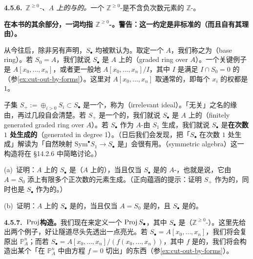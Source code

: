 \textbf{4.5.6.}\ \emph{$\mathbb{Z}^{\ge0}$-\trGradedRing、$A$ 上的\trGradedRing{}与\trFinitelyGenerated{}的\trGradedRing。}\quad 一个 $\mathbb{Z}^{\ge0}$-\trGradedRing{}是不含负次数元素的 $\mathbb{Z}$-\trGradedRing。

\textbf{在本书的其余部分，\trGradedRing{}一词均指 $\mathbb{Z}^{\ge0}$-\trGradedRing。警告：这一约定是非标准的（而且自有其理由）。}

从今往后，除非另有声明，$S_\bullet$ 均被默认为\trGradedRing。取定一个\trRing{} $A$，我们称之为\textbf{\trBaseRing}（base ring）。若 $S_0=A$，我们就说 $S_\bullet$ 是 $A$ 上的\textbf{\trGradedRing}（graded ring over $A$）。一个关键例子是 $A[x_0,\dots,x_n]$，或者更一般地 $A[x_0,\dots,x_n]/I$，其中 $I$ 是满足 $I\cap S_0=0$ 的\trHomogeneous\trIdeal（参\cref{ex:cut-out-by-forms}）。这里对 $A[x_0,\dots,x_n]$ 取通常的\trGrading，即每个 $x_i$ 的权都是 $1$。

子集 $S_+:=\oplus_{i>0}S_i\subset S_\bullet$ 是一个\trIdeal，称为\textbf{\trIrrelevantIdeal}（irrelevant ideal）。「无关」之名的缘由，再过几段自会清楚。若\trIrrelevantIdeal{} $S_+$ 是一个\trFinitelyGenerated{}的\trIdeal，我们就说 $S_\bullet$ 是 $A$ 上的\textbf{\trFinitelyGenerated\trGradedRing}（finitely generated graded ring over $A$）。若 $S_\bullet$ 作为 $A$-\trAlgebra{}由 $S_1$ 生成，我们就说 $S_\bullet$ 是\textbf{在次数 $1$ 处生成的}（generated in degree 1）。（日后我们会发现，把「$S_\bullet$ 在次数 $1$ 处生成」解读为「自然映射 $\mathrm{Sym}^{\bullet}S_1\to S_\bullet$ 是\trSurjectiveMap」会很有用。\emph{\trSymmetricAlgebra}（symmetric algebra）这一构造将在 \S14.2.6 中简略讨论。）

\begin{exercise}\label{ex:fg-graded-rings}
(a)~证明：$A$ 上的\trGradedRing{} $S_\bullet$ 是（$A$ 上的）\trFinitelyGenerated\trGradedRing，当且仅当 $S_\bullet$ 是\trFinitelyGenerated{}的\trGrading{} $A$-\trAlgebra，也就是说，它由 $A=S_0$ 添上有限多个正次数的\trHomogeneous{}元素生成。（正向蕴涵的提示：证明 $S_+$ 作为\trIdeal{}的\trGenerator，同时也是 $S_\bullet$ 作为\trAlgebra{}的\trGenerator。）

(b)~证明：$A$ 上的\trGradedRing{} $S_\bullet$ 是\trNoetherian{}的，当且仅当 $A=S_0$ 是\trNoetherian{}的，且 $S_\bullet$ 是\trFinitelyGenerated{}的\trGradedRing。
\end{exercise}

\textbf{4.5.7.\ $\operatorname{Proj}$构造。}\quad 我们现在来定义一个\trScheme{} $\operatorname{Proj} S_\bullet$，其中 $S_\bullet$ 是（$\mathbb{Z}^{\ge0}$-）\trGradedRing。这里先给出两个例子，好让隧道尽头先透出一点亮光。若 $S_\bullet=A[x_0,\dots,x_n]$，我们将会复原出 $\mathbb{P}^n_A$；而若 $S_\bullet=A[x_0,\dots,x_n]/(f(x_0,\dots,x_n))$，其中 $f$ 是\trHomogeneous{}的，我们将会构造出某个「在 $\mathbb{P}^n_A$ 中由方程 $f=0$ 切出」的东西（参\cref{ex:cut-out-by-forms}）。

